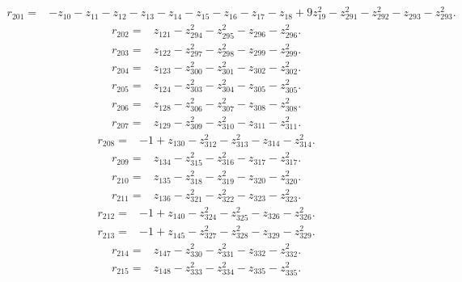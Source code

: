 \begin{align*}
 r_{201}={}&-z_{10}-z_{11}-z_{12}-z_{13}-z_{14}-z_{15}-z_{16}-z_{17}-z_{18}+9z_{19}^{2}-z_{291}^{2}-z_{292}^{2}-z_{293}-z_{293}^{2} .
\end{align*}
\begin{align*}
 r_{202}={}&z_{121}-z_{294}^{2}-z_{295}^{2}-z_{296}-z_{296}^{2} .
\end{align*}
\begin{align*}
 r_{203}={}&z_{122}-z_{297}^{2}-z_{298}^{2}-z_{299}-z_{299}^{2} .
\end{align*}
\begin{align*}
 r_{204}={}&z_{123}-z_{300}^{2}-z_{301}^{2}-z_{302}-z_{302}^{2} .
\end{align*}
\begin{align*}
 r_{205}={}&z_{124}-z_{303}^{2}-z_{304}^{2}-z_{305}-z_{305}^{2} .
\end{align*}
\begin{align*}
 r_{206}={}&z_{128}-z_{306}^{2}-z_{307}^{2}-z_{308}-z_{308}^{2} .
\end{align*}
\begin{align*}
 r_{207}={}&z_{129}-z_{309}^{2}-z_{310}^{2}-z_{311}-z_{311}^{2} .
\end{align*}
\begin{align*}
 r_{208}={}&-1+z_{130}-z_{312}^{2}-z_{313}^{2}-z_{314}-z_{314}^{2} .
\end{align*}
\begin{align*}
 r_{209}={}&z_{134}-z_{315}^{2}-z_{316}^{2}-z_{317}-z_{317}^{2} .
\end{align*}
\begin{align*}
 r_{210}={}&z_{135}-z_{318}^{2}-z_{319}^{2}-z_{320}-z_{320}^{2} .
\end{align*}
\begin{align*}
 r_{211}={}&z_{136}-z_{321}^{2}-z_{322}^{2}-z_{323}-z_{323}^{2} .
\end{align*}
\begin{align*}
 r_{212}={}&-1+z_{140}-z_{324}^{2}-z_{325}^{2}-z_{326}-z_{326}^{2} .
\end{align*}
\begin{align*}
 r_{213}={}&-1+z_{145}-z_{327}^{2}-z_{328}^{2}-z_{329}-z_{329}^{2} .
\end{align*}
\begin{align*}
 r_{214}={}&z_{147}-z_{330}^{2}-z_{331}^{2}-z_{332}-z_{332}^{2} .
\end{align*}
\begin{align*}
 r_{215}={}&z_{148}-z_{333}^{2}-z_{334}^{2}-z_{335}-z_{335}^{2} .
\end{align*}
